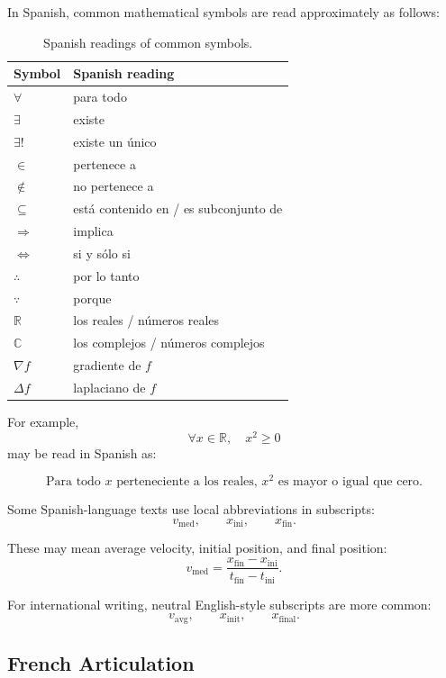 \documentclass[11pt,twocolumn]{article}
\newcommand{\R}{\mathbb{R}}
\newcommand{\C}{\mathbb{C}}
\begin{document}
In Spanish, common mathematical symbols are read approximately as follows:

\begin{table}[ht]
\centering
\caption{Spanish readings of common symbols.}
\begin{tabular}{ll}
\toprule
Symbol & Spanish reading \\
\midrule
$\forall$ & para todo \\
$\exists$ & existe \\
$\exists!$ & existe un único \\
$\in$ & pertenece a \\
$\notin$ & no pertenece a \\
$\subseteq$ & está contenido en / es subconjunto de \\
$\Rightarrow$ & implica \\
$\Leftrightarrow$ & si y sólo si \\
$\therefore$ & por lo tanto \\
$\because$ & porque \\
$\R$ & los reales / números reales \\
$\C$ & los complejos / números complejos \\
$\nabla f$ & gradiente de \(f\) \\
$\Delta f$ & laplaciano de \(f\) \\
\bottomrule
\end{tabular}
\end{table}

For example,
\[
\forall x \in \R,\quad x^2 \ge 0
\]
may be read in Spanish as:

\[
\text{Para todo } x \text{ perteneciente a los reales, } x^2
\text{ es mayor o igual que cero.}
\]

Some Spanish-language texts use local abbreviations in subscripts:
\[
v_{\text{med}},
\qquad
x_{\text{ini}},
\qquad
x_{\text{fin}}.
\]

These may mean average velocity, initial position, and final position:
\[
v_{\text{med}}
=
\frac{x_{\text{fin}}-x_{\text{ini}}}{t_{\text{fin}}-t_{\text{ini}}}.
\]

For international writing, neutral English-style subscripts are more common:
\[
v_{\text{avg}},
\qquad
x_{\text{init}},
\qquad
x_{\text{final}}.
\]

\subsection{French Articulation}
\end{document}
